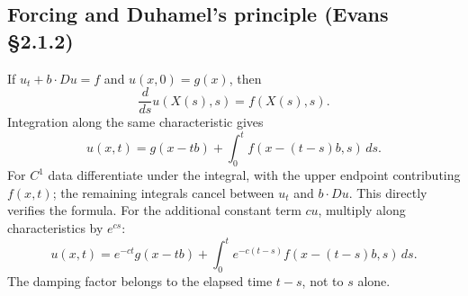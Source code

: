 \subsection{Forcing and Duhamel's principle (Evans \S2.1.2)}
If $u_t+b\cdot Du=f$ and $u(x,0)=g(x)$, then
\[
 \frac d{ds}u(X(s),s)=f(X(s),s).
\]
Integration along the same characteristic gives
\[
 \boxed{u(x,t)=g(x-tb)+\int_0^t f(x-(t-s)b,s)\,ds.}
\]
For $C^1$ data differentiate under the integral, with the upper endpoint
contributing $f(x,t)$; the remaining integrals cancel between
$u_t$ and $b\cdot Du$. This directly verifies the formula.
\Needspace{45mm}
For the additional constant term $cu$, multiply along characteristics
by $e^{cs}$:
\[
 u(x,t)=e^{-ct}g(x-tb)
       +\int_0^t e^{-c(t-s)}f(x-(t-s)b,s)\,ds.
\]
The damping factor belongs to the elapsed time $t-s$, not to $s$ alone.
